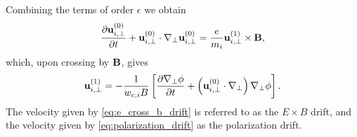 \documentclass[oneside,a4paper,11pt]{report}
\begin{document}
Combining the terms of order $\epsilon$ we obtain
\begin{equation}
    \frac{\partial \mathbf{u}_{i,\perp}^{(0)}}{\partial t} + \mathbf{u}_{i,\perp}^{(0)} \cdot \nabla_\perp \mathbf{u}_{i,\perp}^{(0)} = \frac{e}{m_i} \mathbf{u}_{i,\perp}^{(1)} \times \mathbf{B},
\end{equation}
which, upon crossing by $\mathbf{B}$, gives
\begin{equation}
\label{eq:polarization_drift}
    \mathbf{u}_{i,\perp}^{(1)} = -\frac{1}{w_{c,i} B} \left [ \frac{\partial \nabla_\perp \phi}{\partial t} + \left (\mathbf{u}_{i,\perp}^{(0)} \cdot \nabla_\perp \right ) \nabla_\perp \phi \right].
\end{equation}
The velocity given by \cref{eq:e_cross_b_drift} is referred to as the $E \times B$ drift, and the velocity given by \cref{eq:polarization_drift} as the polarization drift.
\end{document}
